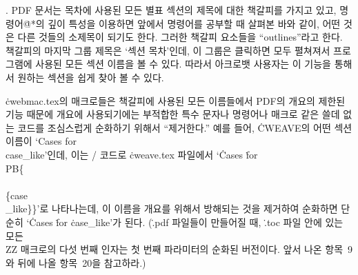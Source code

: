 {%
. {\mc PDF} 문서는 목차에 사용된 모든 별표 섹션의 제목에 대한
책갈피를 가지고 있고, 명령어\.{@*}의 깊이 특성을 이용하면
앞에서 명령어를 공부할 때 살펴본 바와 같이, 어떤 것은 다른 것들의
소제목이 되기도 한다. 그러한 책갈피 요소들을 
``outlines''라고 한다. 책갈피의 마지막 그룹 제목은 `섹션 목차'인데,
이 그룹은 클릭하면 모두 펼쳐져서 프로그램에 사용된 모든
섹션 이름을 볼 수 있다. 따라서 아크로뱃 사용자는 이 기능을 통해서
원하는 섹션을 쉽게 찾아 볼 수 있다. 

\.{cwebmac.tex}의 매크로들은 책갈피에
사용된 모든 이름들에서 {\mc PDF}의 개요의 제한된 기능 때문에 개요에 사용되기에는
부적합한 특수 문자나 명령어나 매크로 같은 쓸데 없는 코드를 조심스럽게 순화하기
위해서 ``제거한다.'' 예를 들어, \.{CWEAVE}의 어떤 섹션 이름이 `Cases for
\\{case\_like}'인데, 이는 \TEX/ 코드로 \.{cweave.tex} 파일에서 `\.{Cases} \.{for}
\.{\\PB\{\\\\\{case\\\_like\}\}}'로 나타나는데, 이 이름을 개요를 위해서 방해되는
것을 제거하여 순화하면 단순히 `\.{Cases} \.{for} \.{case\_like}'가 된다. 
(\.{.pdf} 파일들이 만들어질 때, \.{.toc} 파일 안에 있는 모든 \.{\\ZZ}
매크로의 다섯 번째 인자는 첫 번째 파라미터의 순화된 버전이다. 앞서 나온
항목~9와 뒤에 나올 항목~20을 참고하라.)

}
